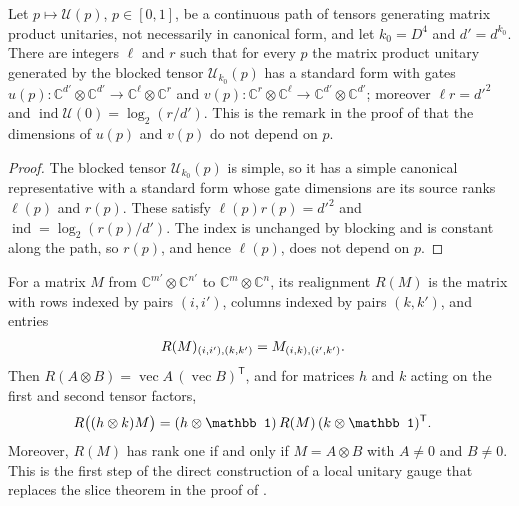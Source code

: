 \begin{lemma}
    \label{lem:mpu_path_fixed_gate_dims}
    \leanok
    Let $p\mapsto\mathcal U(p)$, $p\in[0,1]$, be a continuous path of tensors
    generating matrix product unitaries, not necessarily in canonical form, and
    let $k_0=D^4$ and $d'=d^{k_0}$. There are integers $\ell$ and $r$ such that
    for every $p$ the matrix product unitary generated by the blocked tensor
    $\mathcal U_{k_0}(p)$ has a standard form with gates
    $u(p)\colon\mathbb C^{d'}\otimes\mathbb C^{d'}\to\mathbb C^\ell\otimes\mathbb C^r$
    and
    $v(p)\colon\mathbb C^r\otimes\mathbb C^\ell\to\mathbb C^{d'}\otimes\mathbb C^{d'}$;
    moreover $\ell r=d'^2$ and $\operatorname{ind}\mathcal U(0)=\log_2(r/d')$.
    This is the remark in the proof of \cite[Corollary~IV.7]{Cirac2017MPU} that
    the dimensions of $u(p)$ and $v(p)$ do not depend on $p$.
\end{lemma}

\begin{proof}\leanok
    The blocked tensor $\mathcal U_{k_0}(p)$ is simple, so it has a simple
    canonical representative with a standard form whose gate dimensions are
    its source ranks $\ell(p)$ and $r(p)$. These satisfy
    $\ell(p)r(p)=d'^2$ and $\operatorname{ind}=\log_2(r(p)/d')$. The index is
    unchanged by blocking and is constant along the path, so $r(p)$, and hence
    $\ell(p)$, does not depend on $p$.
\end{proof}

\begin{lemma}
    \label{lem:matrix_realignment_kronecker}
    \leanok
    For a matrix $M$ from $\mathbb C^{m'}\otimes\mathbb C^{n'}$ to
    $\mathbb C^{m}\otimes\mathbb C^{n}$, its realignment $R(M)$ is the matrix
    with rows indexed by pairs $(i,i')$, columns indexed by pairs $(k,k')$,
    and entries
    \begin{align}
        R(M)_{(i,i'),(k,k')} & =M_{(i,k),(i',k')}.
        \notag
    \end{align}
    Then $R(A\otimes B)=\operatorname{vec}A\,(\operatorname{vec}B)^{\mathsf T}$,
    and for matrices $h$ and $k$ acting on the first and second tensor
    factors,
    \begin{align}
        R\bigl((h\otimes k)M\bigr) & =(h\otimes\mathbb 1)\,R(M)\,
        (k\otimes\mathbb 1)^{\mathsf T}.
        \notag
    \end{align}
    Moreover, $R(M)$ has rank one if and only if $M=A\otimes B$ with
    $A\neq0$ and $B\neq0$. This is the first step of the direct construction
    of a local unitary gauge that replaces the slice theorem in the proof of
    \cite[Corollary~IV.7]{Cirac2017MPU}.
\end{lemma}

